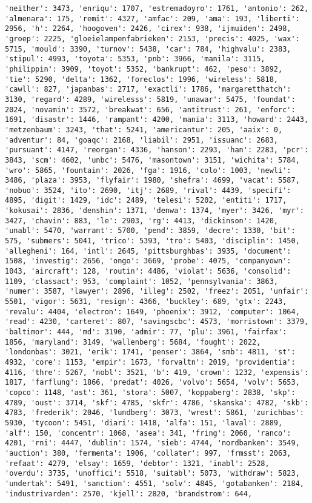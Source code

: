 \documentclass[11pt]{article}
\begin{document}
\begin{Verbatim}[commandchars=\\\{\}]
'neither': 3473, 'enriqu': 1707, 'estremadoyro': 1761, 'antonio': 262, 'almenara': 175, 'remit': 4327, 'amfac': 209, 'ama': 193, 'liberti': 2956, 'h': 2264, 'hoogoven': 2426, 'cirex': 938, 'ijmuiden': 2498, 'groep': 2225, 'gloeielampenfabrieken': 2153, 'precis': 4025, 'wax': 5715, 'mould': 3390, 'turnov': 5438, 'car': 784, 'highvalu': 2383, 'stipul': 4993, 'toyota': 5353, 'pnb': 3966, 'manila': 3115, 'philippin': 3909, 'toyot': 5352, 'bankrupt': 462, 'peso': 3892, 'tie': 5290, 'delta': 1362, 'foreclos': 1996, 'wireless': 5818, 'cawll': 827, 'japanbas': 2717, 'exactli': 1786, 'margaretthatch': 3130, 'regard': 4289, 'wirelesss': 5819, 'unawar': 5475, 'foundat': 2024, 'novamin': 3572, 'breakwat': 656, 'antitrust': 261, 'enforc': 1691, 'disastr': 1446, 'rampant': 4200, 'mania': 3113, 'howard': 2443, 'metzenbaum': 3243, 'that': 5241, 'americantur': 205, 'aaix': 0, 'adventur': 84, 'goaqc': 2168, 'liabil': 2951, 'issuanc': 2683, 'pursuant': 4147, 'reorgan': 4336, 'hanson': 2293, 'han': 2283, 'pcr': 3843, 'scm': 4602, 'unbc': 5476, 'masontown': 3151, 'wichita': 5784, 'wro': 5865, 'fountain': 2026, 'fga': 1916, 'colo': 1003, 'newli': 3486, 'plaza': 3953, 'flyfair': 1980, 'shefra': 4699, 'vacat': 5587, 'nobuo': 3524, 'ito': 2690, 'itj': 2689, 'rival': 4439, 'specifi': 4895, 'digit': 1429, 'idc': 2489, 'telesi': 5202, 'entiti': 1717, 'kokusai': 2836, 'denshin': 1371, 'denwa': 1374, 'myer': 3426, 'myr': 3427, 'chavin': 883, 'le': 2903, 'rg': 4413, 'dickinson': 1420, 'unabl': 5470, 'warrant': 5700, 'pend': 3859, 'decre': 1330, 'bit': 575, 'submers': 5041, 'trico': 5393, 'tro': 5403, 'disciplin': 1450, 'allegheni': 164, 'intl': 2645, 'pittsburghbas': 3935, 'document': 1508, 'investig': 2656, 'ongo': 3669, 'probe': 4075, 'companyown': 1043, 'aircraft': 128, 'routin': 4486, 'violat': 5636, 'consolid': 1109, 'classact': 953, 'complaint': 1052, 'pennsylvania': 3863, 'numer': 3587, 'lawyer': 2896, 'illeg': 2502, 'freez': 2051, 'unfair': 5501, 'vigor': 5631, 'resign': 4366, 'buckley': 689, 'gtx': 2243, 'revalu': 4404, 'electron': 1649, 'phoenix': 3912, 'computer': 1064, 'read': 4230, 'carteret': 807, 'savingscbc': 4573, 'morristown': 3379, 'baltimor': 444, 'md': 3190, 'admir': 77, 'plu': 3961, 'fairfax': 1856, 'maryland': 3149, 'wallenberg': 5684, 'fought': 2022, 'londonbas': 3021, 'erik': 1741, 'penser': 3864, 'smb': 4811, 'st': 4932, 'core': 1153, 'empir': 1673, 'forvaltn': 2019, 'providentia': 4116, 'thre': 5267, 'nobl': 3521, 'b': 419, 'crown': 1232, 'expensis': 1817, 'farflung': 1866, 'predat': 4026, 'volvo': 5654, 'volv': 5653, 'copco': 1148, 'ast': 361, 'stora': 5007, 'koppaberg': 2838, 'skp': 4789, 'oust': 3714, 'skf': 4785, 'skfr': 4786, 'skanska': 4782, 'skb': 4783, 'frederik': 2046, 'lundberg': 3073, 'wrest': 5861, 'zurichbas': 5930, 'tycoon': 5451, 'diari': 1418, 'alfa': 151, 'laval': 2889, 'alf': 150, 'concentr': 1068, 'asea': 341, 'fring': 2060, 'ranco': 4201, 'rni': 4447, 'dublin': 1574, 'sieb': 4744, 'nordbanken': 3549, 'auction': 380, 'fermenta': 1906, 'collater': 997, 'frmsst': 2063, 'refaat': 4279, 'elsay': 1659, 'debtor': 1321, 'inabl': 2528, 'overdu': 3735, 'unoffici': 5518, 'suitabl': 5073, 'withdraw': 5823, 'undertak': 5491, 'sanction': 4551, 'solv': 4845, 'gotabanken': 2184, 'industrivarden': 2570, 'kjell': 2820, 'brandstrom': 644, 
\end{Verbatim}
\end{document}
